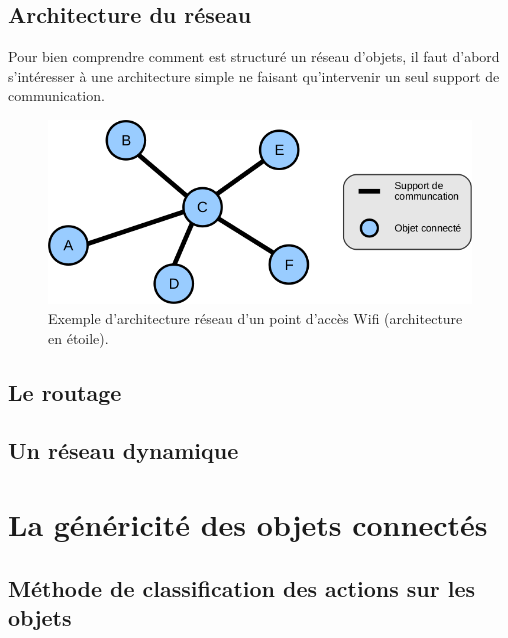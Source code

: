 	\subsection{Architecture du réseau}
		Pour bien comprendre comment est structuré un réseau d'objets, il faut d'abord s'intéresser 
		à une architecture simple ne faisant qu'intervenir un seul support de communication.
		
		\begin{figure}[!ht]
         \centering
         \includegraphics[width=.8\textwidth]{img/reseau_etoile.png}
         \caption{Exemple d'architecture réseau d'un point d'accès Wifi (architecture en étoile).}
         \label{testEffibox}
      \end{figure}

	\subsection{Le routage}
	\subsection{Un réseau dynamique}

\section{La généricité des objets connectés}
	\subsection{Méthode de classification des actions sur les objets}
